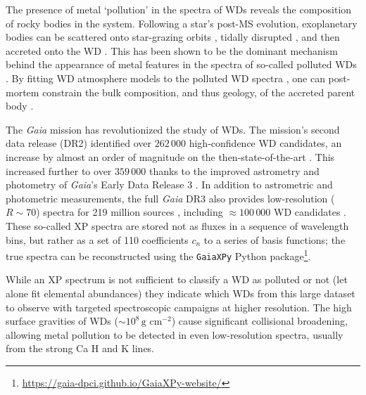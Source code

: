 \documentclass[fleqn,usenatbib]{rasti}
\begin{document}
The presence of metal `pollution' in the spectra of WDs reveals the composition of rocky bodies in the system.
Following a star's post-MS evolution, exoplanetary bodies can be scattered onto star-grazing orbits \citep{debes02, bonsor11, frewen14, mustill18, maldonado20dyn, maldonado20und}, tidally disrupted \citep{jura03, veras14}, and then accreted onto the WD \citep{brouwers22}.
This has been shown to be the dominant mechanism behind the appearance of metal features in the spectra of so-called polluted WDs \citep[e.g.,][]{farihi10, veras16}.
By fitting WD atmosphere models to the polluted WD spectra \citep[e.g.][]{koester10, blouin18, badenasagusti24}, one can post-mortem constrain the bulk composition, and thus geology, of the accreted parent body \citep[e.g.][]{xu21}.

The \textit{Gaia} mission \citep{gaia} has revolutionized the study of WDs.
The mission's second data release (DR2) identified over $262\,000$ high-confidence WD candidates, an increase by almost an order of magnitude on the then-state-of-the-art \citep{gentilefusillo19, gaiadr2}.
This increased further to over $359\,000$ thanks to the improved astrometry and photometry of \textit{Gaia}'s Early Data Release 3 \citep[EDR3;][]{gentilefusillo21, gaiadr3}.
In addition to astrometric and photometric measurements, the full \textit{Gaia} DR3 also provides low-resolution ($R\sim70$) spectra for 219 million sources
\citep{carrasco21, gaiadr3}, including $\approx100\,000$ WD candidates \citep{gentilefusillo21}.
These so-called XP spectra are stored not as fluxes in a sequence of wavelength bins, but rather as a set of 110 coefficients $c_n$ to a series of basis functions; the true spectra can be reconstructed using the \texttt{GaiaXPy} Python package\footnote{
    \url{https://gaia-dpci.github.io/GaiaXPy-website/}
}.

While an XP spectrum is not sufficient to classify a WD as polluted or not (let alone fit elemental abundances) they indicate which WDs from this large dataset to observe with targeted spectroscopic campaigns at higher resolution.
The high surface gravities of WDs ($\sim 10^8\,\text{g cm}^{-2}$) cause significant collisional broadening, allowing metal pollution to be detected in even low-resolution spectra, usually from the strong Ca H and K lines.
\end{document}
